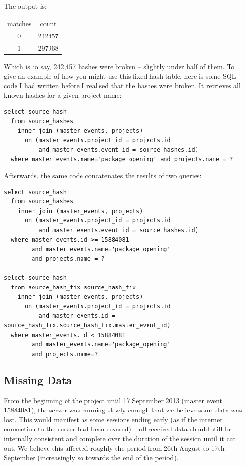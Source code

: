 \documentclass{report}
\begin{document}
The output is:

\begin{tabular}{cc}
matches & count \\
0 & 242457 \\
1 & 297968 \\
\end{tabular}

Which is to say, 242,457 hashes were broken -- slightly under half of them.  To give an example of how you might use this fixed hash table, here is some SQL code I had written before I realised that the hashes were broken.  It retrieves all known hashes for a given project name:

\begin{lstlisting}
select source_hash
  from source_hashes
    inner join (master_events, projects)
      on (master_events.project_id = projects.id
          and master_events.event_id = source_hashes.id)
  where master_events.name='package_opening' and projects.name = ?
\end{lstlisting}

Afterwards, the same code concatenates the results of two queries:

\begin{lstlisting}
select source_hash
  from source_hashes
    inner join (master_events, projects)
      on (master_events.project_id = projects.id
          and master_events.event_id = source_hashes.id)
  where master_events.id >= 15884081
        and master_events.name='package_opening'
        and projects.name = ?

select source_hash
  from source_hash_fix.source_hash_fix
    inner join (master_events, projects)
      on (master_events.project_id = projects.id
          and master_events.id = source_hash_fix.source_hash_fix.master_event_id)
  where master_events.id < 15884081
        and master_events.name='package_opening'
        and projects.name=?
\end{lstlisting}

\lstset{columns=flexible,language=SQL,basicstyle=\ttfamily}
\subsection{Missing Data}

From the beginning of the project until 17 September 2013 (master event 15884081), the server was running slowly enough that we believe some data was lost.  This would manifest as some sessions ending early (as if the internet connection to the server had been severed) -- all received data should still be internally consistent and complete over the duration of the session until it cut out.  We believe this affected roughly the period from 26th August to 17th September (increasingly so towards the end of the period).
\end{document}
